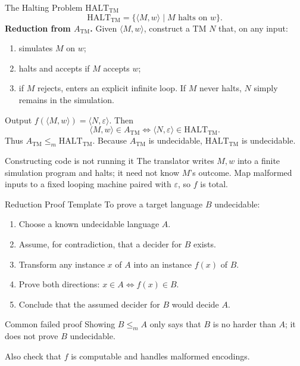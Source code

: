 \documentclass[10pt]{beamer}
\newcommand{\ATM}{A_{\mathrm{TM}}}
\newcommand{\HALTTM}{\mathrm{HALT}_{\mathrm{TM}}}
\begin{document}
\begin{frame}{The Halting Problem $\HALTTM$}
  \small
  \[
    \HALTTM=\{\langle M,w\rangle\mid M\text{ halts on }w\}.
  \]
  \textbf{Reduction from $\ATM$.} Given $\langle M,w\rangle$, construct a TM $N$ that, on any input:
  \begin{enumerate}
    \item simulates $M$ on $w$;
    \item halts and accepts if $M$ accepts $w$;
    \item if $M$ rejects, enters an explicit infinite loop. If $M$ never
      halts, $N$ simply remains in the simulation.
  \end{enumerate}
  Output $f(\langle M,w\rangle)=\langle N,\varepsilon\rangle$. Then
  \[
    \langle M,w\rangle\in\ATM
    \iff
    \langle N,\varepsilon\rangle\in\HALTTM.
  \]
  Thus $\ATM\le_m\HALTTM$. Because $\ATM$ is undecidable, $\HALTTM$ is undecidable.
  \begin{block}{Constructing code is not running it}
    The translator writes $M,w$ into a finite simulation program and halts;
    it need not know $M$'s outcome. Map malformed inputs to a fixed looping
    machine paired with $\varepsilon$, so $f$ is total.
  \end{block}
\end{frame}

\begin{frame}{Reduction Proof Template}
  To prove a target language $B$ undecidable:
  \begin{enumerate}
    \item Choose a known undecidable language $A$.
    \item Assume, for contradiction, that a decider for $B$ exists.
    \item Transform any instance $x$ of $A$ into an instance $f(x)$ of $B$.
    \item Prove both directions: $x\in A\iff f(x)\in B$.
    \item Conclude that the assumed decider for $B$ would decide $A$.
  \end{enumerate}
  \begin{alertblock}{Common failed proof}
    Showing $B\le_m A$ only says that $B$ is no harder than $A$; it does not prove $B$ undecidable.
  \end{alertblock}
  Also check that $f$ is computable and handles malformed encodings.
\end{frame}
\end{document}
